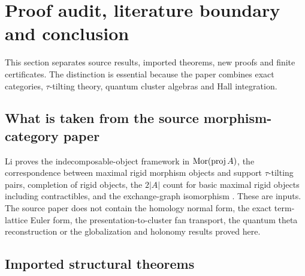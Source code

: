 \section{Proof audit, literature boundary and conclusion}
\label{sec:audit}

This section separates source results, imported theorems, new proofs and
finite certificates.  The distinction is essential because the paper combines
exact categories, $\tau$-tilting theory, quantum cluster algebras and Hall
integration.

\subsection{What is taken from the source morphism-category paper}

Li proves the indecomposable-object framework in
$\operatorname{Mor}(\operatorname{proj} A)$, the correspondence between maximal rigid morphism objects and
support $\tau$-tilting pairs, completion of rigid objects, the
$2|A|$ count for basic maximal rigid objects including contractibles, and the
exchange-graph isomorphism \cite{Li}.  These are inputs.  The source paper does
not contain the homology normal form, the exact term-lattice Euler form, the
presentation-to-cluster fan transport, the quantum theta reconstruction or the
globalization and holonomy results proved here.

\subsection{Imported structural theorems}


